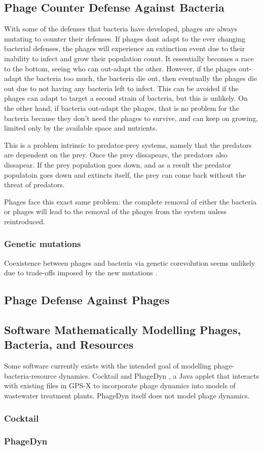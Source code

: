 \subsection{Phage Counter Defense Against Bacteria}
With some of the defenses that bacteria have developed, phages are always mutating to counter their defenses. 
If phages dont adapt to the ever changing bacterial defenses, the phages will experience an extinction event due to their inability to infect and grow their population count. 
It essentially becomes a race to the bottom, seeing who can out-adapt the other. 
However, if the phages out-adapt the bacteria too much, the bacteria die out, then eventually the phages die out due to not having any bacteria left to infect. 
This can be avoided if the phages can adapt to target a second strain of bacteria, but this is unlikely. 
On the other hand, if bacteria out-adapt the phages, that is no problem for the bacteria because they don't need the phages to survive, and can keep on growing, limited only by the available space and nutrients. 

This is a problem intrinsic to predator-prey systems, namely that the predators are dependent on the prey. 
Once the prey dissapears, the predators also dissapear. 
If the prey population goes down, and as a result the predator populatoin goes down and extincts itself, the prey can come back without the threat of predators. 

Phages face this exact same problem: the complete removal of either the bacteria or phages will lead to the removal of the phages from the system unless reintroduced. 

\subsubsection{Genetic mutations}


Coexistence between phages and bacteria via genetic corevolution seems unlikely due to trade-offs imposed by the new mutations \cite{bullOptimalityModelsPhage2006}. 


\subsection{Phage Defense Against Phages}


\subsection{Software Mathematically Modelling Phages, Bacteria, and Resources}
Some software currently exists with the intended goal of modelling phage-bacteria-resource dynamics. 
Cocktail \cite{nilssonCocktailComputerProgram2022} and PhageDyn \cite{krysiak-baltynSimulationPhageDynamics2017}, a Java applet that interacts with existing files in GPS-X \cite{AdvancedWastewaterModelling} to incorporate phage dynamics into models of wastewater treatment plants. PhageDyn itself does not model phage dynamics. 
\subsubsection{Cocktail}
\cite{nilssonCocktailComputerProgram2022}

\subsubsection{PhageDyn}
\cite{krysiak-baltynSimulationPhageDynamics2017}